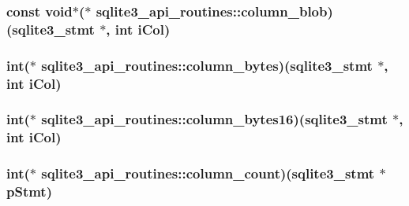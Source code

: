 \hypertarget{structsqlite3__api__routines_a85459d5ec92d143a2a3da9143112a707}{
\subsubsection[{column\-\_\-blob}]{\setlength{\rightskip}{0pt plus 5cm}const void$\ast$($\ast$ sqlite3\-\_\-api\-\_\-routines\-::column\-\_\-blob)({\bf sqlite3\-\_\-stmt} $\ast$, int i\-Col)}}\label{structsqlite3__api__routines_a85459d5ec92d143a2a3da9143112a707}
\hypertarget{structsqlite3__api__routines_a79150244afb5f778840bc9df72d55342}{
\subsubsection[{column\-\_\-bytes}]{\setlength{\rightskip}{0pt plus 5cm}int($\ast$ sqlite3\-\_\-api\-\_\-routines\-::column\-\_\-bytes)({\bf sqlite3\-\_\-stmt} $\ast$, int i\-Col)}}\label{structsqlite3__api__routines_a79150244afb5f778840bc9df72d55342}
\hypertarget{structsqlite3__api__routines_ac1daf0a08de4a33c8db27a29f13a26ad}{
\subsubsection[{column\-\_\-bytes16}]{\setlength{\rightskip}{0pt plus 5cm}int($\ast$ sqlite3\-\_\-api\-\_\-routines\-::column\-\_\-bytes16)({\bf sqlite3\-\_\-stmt} $\ast$, int i\-Col)}}\label{structsqlite3__api__routines_ac1daf0a08de4a33c8db27a29f13a26ad}
\hypertarget{structsqlite3__api__routines_af750a4727dc59edb4ad2933e28bfa358}{
\subsubsection[{column\-\_\-count}]{\setlength{\rightskip}{0pt plus 5cm}int($\ast$ sqlite3\-\_\-api\-\_\-routines\-::column\-\_\-count)({\bf sqlite3\-\_\-stmt} $\ast$p\-Stmt)}}\label{structsqlite3__api__routines_af750a4727dc59edb4ad2933e28bfa358}
